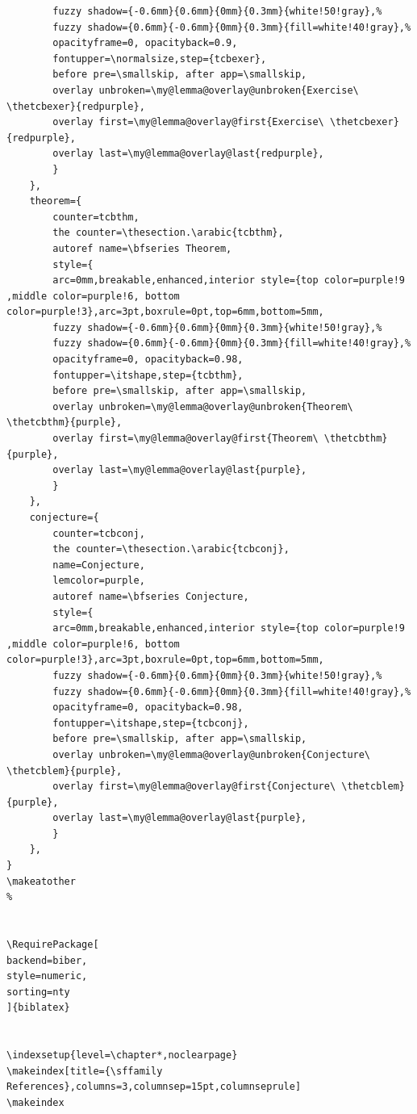 \documentclass[lang=en,12pt]{beautybook}
\begin{document}
\begin{lstlisting}
        fuzzy shadow={-0.6mm}{0.6mm}{0mm}{0.3mm}{white!50!gray},% 
        fuzzy shadow={0.6mm}{-0.6mm}{0mm}{0.3mm}{fill=white!40!gray},%
        opacityframe=0, opacityback=0.9,
        fontupper=\normalsize,step={tcbexer},
        before pre=\smallskip, after app=\smallskip,
        overlay unbroken=\my@lemma@overlay@unbroken{Exercise\ \thetcbexer}{redpurple},
        overlay first=\my@lemma@overlay@first{Exercise\ \thetcbexer}{redpurple},
        overlay last=\my@lemma@overlay@last{redpurple},
        }
    },
    theorem={
        counter=tcbthm,
        the counter=\thesection.\arabic{tcbthm},
        autoref name=\bfseries Theorem,
        style={
        arc=0mm,breakable,enhanced,interior style={top color=purple!9 ,middle color=purple!6, bottom color=purple!3},arc=3pt,boxrule=0pt,top=6mm,bottom=5mm,
        fuzzy shadow={-0.6mm}{0.6mm}{0mm}{0.3mm}{white!50!gray},% 
        fuzzy shadow={0.6mm}{-0.6mm}{0mm}{0.3mm}{fill=white!40!gray},%
        opacityframe=0, opacityback=0.98,
        fontupper=\itshape,step={tcbthm},
        before pre=\smallskip, after app=\smallskip,
        overlay unbroken=\my@lemma@overlay@unbroken{Theorem\ \thetcbthm}{purple},
        overlay first=\my@lemma@overlay@first{Theorem\ \thetcbthm}{purple},
        overlay last=\my@lemma@overlay@last{purple},
        }
    },
    conjecture={
        counter=tcbconj,
        the counter=\thesection.\arabic{tcbconj},
        name=Conjecture, 
        lemcolor=purple, 
        autoref name=\bfseries Conjecture,
        style={
        arc=0mm,breakable,enhanced,interior style={top color=purple!9 ,middle color=purple!6, bottom color=purple!3},arc=3pt,boxrule=0pt,top=6mm,bottom=5mm,
        fuzzy shadow={-0.6mm}{0.6mm}{0mm}{0.3mm}{white!50!gray},% 
        fuzzy shadow={0.6mm}{-0.6mm}{0mm}{0.3mm}{fill=white!40!gray},%
        opacityframe=0, opacityback=0.98,
        fontupper=\itshape,step={tcbconj},
        before pre=\smallskip, after app=\smallskip,
        overlay unbroken=\my@lemma@overlay@unbroken{Conjecture\ \thetcblem}{purple},
        overlay first=\my@lemma@overlay@first{Conjecture\ \thetcblem}{purple},
        overlay last=\my@lemma@overlay@last{purple},
        }
    },
}
\makeatother
%


\RequirePackage[
backend=biber,
style=numeric,
sorting=nty
]{biblatex}


\indexsetup{level=\chapter*,noclearpage}
\makeindex[title={\sffamily References},columns=3,columnsep=15pt,columnseprule]
\makeindex


\end{lstlisting}
\end{document}
